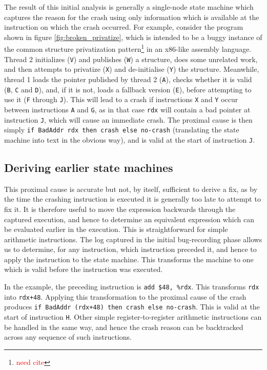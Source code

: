 \documentclass[10pt,twocolumn,preprint,natbib,authoryear]{sigplanconf}
\newcommand{\editorial}[1]{\textcolor{red}{\footnote{\textcolor{red}{#1}}}}
\newcommand{\needCite}{\editorial{need cite}}
\begin{document}
The result of this initial analysis is generally a single-node state
machine which captures the reason for the crash using only information
which is available at the instruction on which the crash occurred.
For example, consider the program shown in figure
\ref{fig:broken_privatize}, which is intended to be a buggy instance
of the common structure privatization pattern\needCite{} in an
x86-like assembly language.  Thread 2 initializes (\verb|V|) and
publishes (\verb|W|) a structure, does some unrelated work, and then
attempts to privatize (\verb|X|) and de-initialise (\verb|Y|) the
structure.  Meanwhile, thread 1 loads the pointer published by thread
2 (\verb|A|), checks whether it is valid (\verb|B|, \verb|C| and
\verb|D|), and, if it is not, loads a fallback version (\verb|E|),
before attempting to use it (\verb|F| through \verb|J|).  This will
lead to a crash if instructions \verb|X| and \verb|Y| occur between
instructions \verb|A| and \verb|G|, as in that case \verb|rdx| will
contain a bad pointer at instruction \verb|J|, which will cause an
immediate crash.  The proximal cause is then simply
\verb|if BadAddr rdx then crash else no-crash| (translating the state
machine into text in the obvious way), and is valid at the start of
instruction \verb|J|.

\subsection{Deriving earlier state machines}
This proximal cause is accurate but not, by itself, sufficient to
derive a fix, as by the time the crashing instruction is executed it
is generally too late to attempt to fix it.  It is therefore useful to
move the expression backwards through the captured execution, and
hence to determine an equivalent expression which can be evaluated
earlier in the execution.  This is straightforward for simple
arithmetic instructions.  The log captured in the initial
bug-recording phase allows us to determine, for any instruction, which
instruction preceded it, and hence to apply the instruction to the
state machine.  This transforms the machine to one which is valid
before the instruction was executed.

In the example, the preceding instruction is \verb|add $48, %rdx|.
This transforms \verb|rdx| into \verb|rdx+48|.  Applying this
transformation to the proximal cause of the crash produces
\verb|if BadAddr (rdx+48) then crash else no-crash|.  This is valid at
the start of instruction \verb|H|.  Other simple register-to-register
arithmetic instructions can be handled in the same way, and hence the
crash reason can be backtracked across any sequence of such
instructions.
\end{document}
